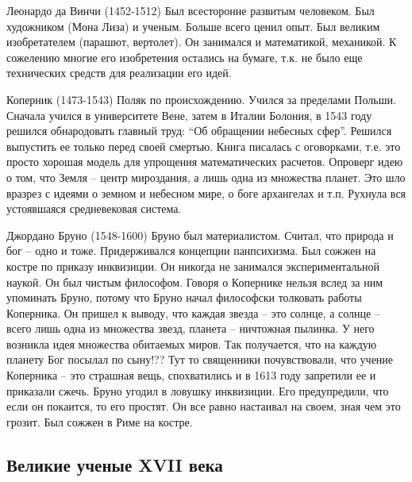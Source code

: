 Леонардо да Винчи (1452-1512) Был всесторонне развитым человеком. Был художником (Мона Лиза) и ученым. Больше всего ценил опыт. Был великим изобретателем (парашют, вертолет). Он занимался и математикой, механикой. К сожелению многие его изобретения остались на бумаге, т.к. не было еще технических средств для реализации его идей.

Коперник (1473-1543) Поляк по происхождению. Учился за пределами Польши. Сначала учился в университете Вене, затем в Италии Болония, в 1543 году решился обнародовать главный труд: “Об обращении небесных сфер”. Решился выпустить ее только перед своей смертью. Книга писалась с оговорками, т.е. это просто хорошая модель для упрощения математических расчетов. Опроверг идею о том, что Земля – центр мироздания, а лишь одна из множества планет. Это шло вразрез с идеями о земном и небесном мире, о боге архангелах и т.п. Рухнула вся устоявшаяся средневековая система.

Джордано Бруно (1548-1600) Бруно был материалистом. Считал, что природа и бог – одно и тоже. Придерживался концепции панпсихизма. Был сожжен на костре по приказу инквизиции. Он никогда не занимался экспериментальной наукой. Он был чистым философом. Говоря о Копернике нельзя вслед за ним упоминать Бруно, потому что Бруно начал философски толковать работы Коперника. Он пришел к выводу, что каждая звезда – это солнце, а солнце – всего лишь одна из множества звезд, планета – ничтожная пылинка. У него возникла идея множества обитаемых миров. Так получается, что на каждую планету Бог посылал по сыну!?? Тут то священники почувствовали, что учение Коперника – это страшная вещь, спохватились и в 1613 году запретили ее и приказали сжечь. Бруно угодил в ловушку инквизиции. Его предупредили, что если он покаится, то его простят. Он все равно настаивал на своем, зная чем это грозит. Был сожжен в Риме на костре.
\subsection{Великие ученые XVII века}

